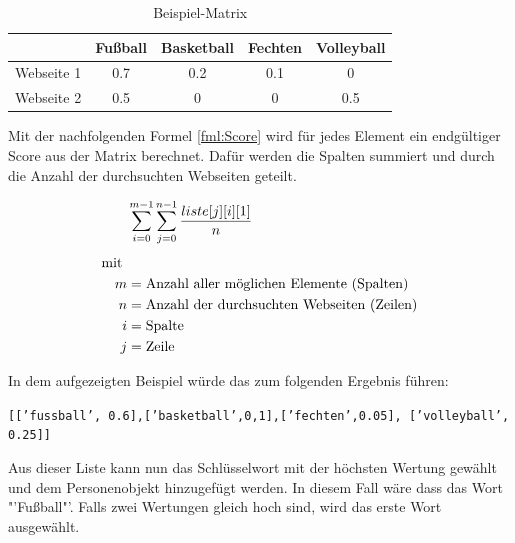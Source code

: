 	\begin{table}[h!]
		\centering
		\begin{tabular}{ | c | c | c |c |c|}
			\hline
			& Fußball & Basketball & Fechten& Volleyball\\ \hline
			Webseite 1& 0.7 & 0.2 & 0.1 & 0\\ \hline
			Webseite 2& 0.5 & 0 & 0 & 0.5\\ \hline
		\end{tabular}
		\label{img:beispielMatrix}
		\caption{Beispiel-Matrix}
	\end{table}
	
	Mit der nachfolgenden Formel \ref{fml:Score} wird für jedes Element ein endgültiger Score aus der Matrix berechnet. Dafür werden die Spalten summiert und durch die Anzahl der durchsuchten Webseiten geteilt.
	
	\begin{align}%
	\label{fml:Score}
	\begin{split}%
	&\sum\limits_{i=0}^{m-1}\sum\limits_{j=0}^{n-1} \frac{liste[j][i][1]}{n}\\[0.25\baselineskip]%
	\text{mit } \\
	m &= \text{Anzahl aller möglichen Elemente (Spalten)}\\
	n &= \text{Anzahl der durchsuchten Webseiten (Zeilen)}\\
	i &= \text{Spalte}\\             %
	j &= \text{Zeile}
	\end{split}
	\end{align}
	
	
	In dem aufgezeigten Beispiel würde das zum folgenden Ergebnis führen:
	
	\texttt{[['fussball', 0.6],['basketball',0,1],['fechten',0.05],
		['volleyball', 0.25]]}		
	
	Aus dieser Liste kann nun das Schlüsselwort mit der höchsten Wertung gewählt und dem Personenobjekt hinzugefügt werden. In diesem Fall wäre dass das Wort "'Fußball"'. Falls zwei Wertungen gleich hoch sind, wird das erste Wort ausgewählt.
	
